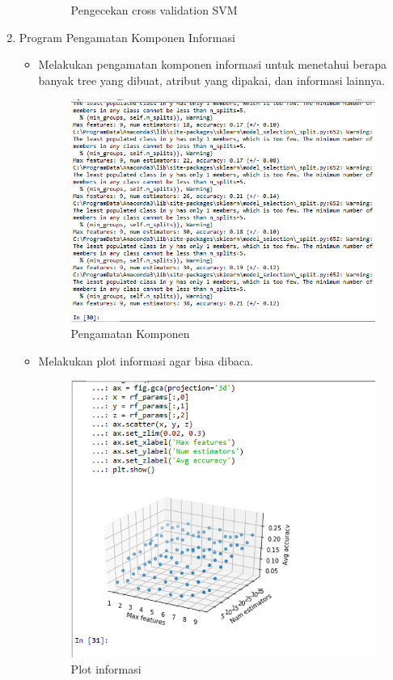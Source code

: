 \begin{enumerate}
\begin{itemize}
\begin{figure}[!hbtp]
			\caption{Pengecekan cross validation SVM}
			\label{contoh}
			\end{figure}
	\end{itemize}
\item Program Pengamatan Komponen Informasi
	\begin{itemize}
		\item Melakukan pengamatan komponen informasi untuk menetahui berapa banyak tree yang dibuat, atribut yang dipakai, dan informasi lainnya.
			\begin{figure}[!hbtp]
			\centering
			\includegraphics[scale=0.5]{figures/AIP/ai35.PNG}
			\caption{Pengamatan Komponen}
			\label{contoh}
			\end{figure}
		\item Melakukan plot informasi agar bisa dibaca.
			\begin{figure}[!hbtp]
			\centering
			\includegraphics[scale=0.5]{figures/AIP/ai36.PNG}
			\caption{Plot informasi}
			\label{contoh}
			\end{figure}
	\end{itemize}
\end{enumerate}

